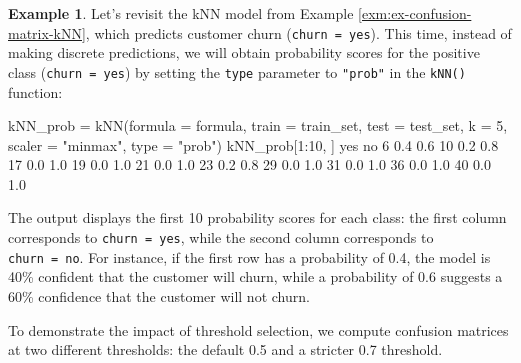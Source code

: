 \documentclass[
  11pt,
]{book}
\makeatletter
\newenvironment{Shaded}{}{}
\newcommand{\AttributeTok}[1]{#1}
\newcommand{\DecValTok}[1]{#1}
\newcommand{\FloatTok}[1]{#1}
\newcommand{\FunctionTok}[1]{#1}
\newcommand{\NormalTok}[1]{#1}
\newcommand{\OtherTok}[1]{\textcolor[rgb]{0.39,0.39,0.39}{#1}}
\newcommand{\SpecialCharTok}[1]{\textcolor[rgb]{0.39,0.39,0.39}{#1}}
\newcommand{\StringTok}[1]{\textcolor[rgb]{0.39,0.39,0.39}{#1}}
\newenvironment{kframe}{%
\medskip{}
\setlength{\fboxsep}{.8em}
 \def\at@end@of@kframe{}%
 \ifinner\ifhmode%
  \def\at@end@of@kframe{\end{minipage}}%
  \begin{minipage}{\columnwidth}%
 \fi\fi%
 \def\FrameCommand##1{\hskip\@totalleftmargin \hskip-\fboxsep
 \colorbox{shadecolor}{##1}\hskip-\fboxsep
     \hskip-\linewidth \hskip-\@totalleftmargin \hskip\columnwidth}%
 \MakeFramed {\advance\hsize-\width
   \@totalleftmargin\z@ \linewidth\hsize
   \@setminipage}}%
 {\par\unskip\endMakeFramed%
 \at@end@of@kframe}
\renewenvironment{Shaded}{\begin{kframe}}{\end{kframe}}
\theoremstyle{definition}
\theoremstyle{definition}
\newtheorem{example}{Example}[chapter]
\theoremstyle{definition}
\theoremstyle{definition}
\theoremstyle{remark}
\makeatother
\begin{document}
\begin{example}
\protect\hypertarget{exm:ex-confusion-matrix-kNN-prob}{}\label{exm:ex-confusion-matrix-kNN-prob}Let's revisit the kNN model from Example \ref{exm:ex-confusion-matrix-kNN}, which predicts customer churn (\texttt{churn\ =\ yes}). This time, instead of making discrete predictions, we will obtain probability scores for the positive class (\texttt{churn\ =\ yes}) by setting the \texttt{type} parameter to \texttt{"prob"} in the \texttt{kNN()} function:

\begin{Shaded}
\begin{Highlighting}[]
\NormalTok{kNN\_prob }\OtherTok{=} \FunctionTok{kNN}\NormalTok{(}\AttributeTok{formula =}\NormalTok{ formula, }\AttributeTok{train =}\NormalTok{ train\_set, }
               \AttributeTok{test =}\NormalTok{ test\_set, }\AttributeTok{k =} \DecValTok{5}\NormalTok{, }\AttributeTok{scaler =} \StringTok{"minmax"}\NormalTok{,}
               \AttributeTok{type =} \StringTok{"prob"}\NormalTok{)}
\NormalTok{kNN\_prob[}\DecValTok{1}\SpecialCharTok{:}\DecValTok{10}\NormalTok{, ]}
\NormalTok{      yes  no}
   \DecValTok{6}  \FloatTok{0.4} \FloatTok{0.6}
   \DecValTok{10} \FloatTok{0.2} \FloatTok{0.8}
   \DecValTok{17} \FloatTok{0.0} \FloatTok{1.0}
   \DecValTok{19} \FloatTok{0.0} \FloatTok{1.0}
   \DecValTok{21} \FloatTok{0.0} \FloatTok{1.0}
   \DecValTok{23} \FloatTok{0.2} \FloatTok{0.8}
   \DecValTok{29} \FloatTok{0.0} \FloatTok{1.0}
   \DecValTok{31} \FloatTok{0.0} \FloatTok{1.0}
   \DecValTok{36} \FloatTok{0.0} \FloatTok{1.0}
   \DecValTok{40} \FloatTok{0.0} \FloatTok{1.0}
\end{Highlighting}
\end{Shaded}

The output displays the first 10 probability scores for each class: the first column corresponds to \texttt{churn\ =\ yes}, while the second column corresponds to \texttt{churn\ =\ no}. For instance, if the first row has a probability of 0.4, the model is 40\% confident that the customer will churn, while a probability of 0.6 suggests a 60\% confidence that the customer will not churn.

To demonstrate the impact of threshold selection, we compute confusion matrices at two different thresholds: the default 0.5 and a stricter 0.7 threshold.


\end{example}
\end{document}
